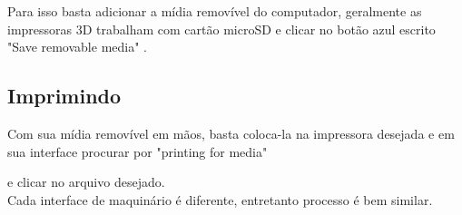 Para isso basta adicionar a mídia removível do computador, geralmente as impressoras 3D trabalham com cartão microSD e clicar no botão azul escrito "Save removable media" .\\[0.2cm]



\subsection{Imprimindo}

Com sua mídia removível em mãos, basta coloca-la na impressora desejada e em sua interface procurar por "printing for media"

e clicar no arquivo desejado. \\[0.4cm]



Cada interface de maquinário é diferente, entretanto processo é bem similar.\\[0.2cm]


